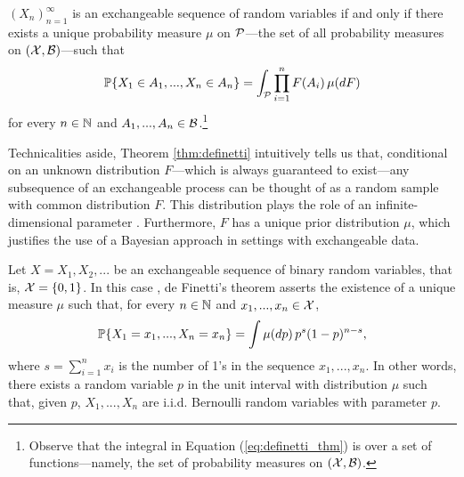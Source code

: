\begin{theorem}[de Finneti] \label{thm:definetti}
	$(X_n)_{n=1}^{\infty}$ is an exchangeable sequence of random variables if and only if there exists a unique probability measure $\mu$ on $\mathcal{P}$---the set of all probability measures on $(\mathcal{X}, \mathcal{B})$---such that
	\begin{equation} \label{eq:definetti_thm}
		\mathbb{P} \{ X_1 \in A_1, ..., X_n \in A_n \} = \int_{\mathcal{P}}  \prod_{i=1}^n F(A_i) \, \mu(dF)
	\end{equation} 
	for every $n \in \mathbb{N}$ and $A_1, ..., A_n \in \mathcal{B}$.\footnote{Observe that the integral in Equation (\ref{eq:definetti_thm}) is over a set of functions---namely, the set of probability measures on $(\mathcal{X}, \mathcal{B})$.}
\end{theorem}




Technicalities aside, Theorem \ref{thm:definetti} intuitively tells us that, conditional on an unknown distribution $F$---which is always guaranteed to exist---any subsequence of an exchangeable process can be thought of as a random sample with common distribution $F$. This distribution plays the role of an infinite-dimensional parameter \cite[][Ch.~4.3]{BernardoSmith:1994:BayesianTheory}. Furthermore, $F$ has a unique prior distribution $\mu$, which justifies the use of a Bayesian approach in settings with exchangeable data.


\begin{mdframed}[backgroundcolor=mygray] 
	\begin{example} \label{ex:binary_definetti}
		Let $X = X_1, X_2, ...$ be an exchangeable sequence of binary random variables, that is, $\mathcal{X} = \{0, 1\}$. In this case \cite[see][p.111]{Diaconis:1988:PartialExchang}, de Finetti's theorem asserts the existence of a unique measure $\mu$ such that, for every $n \in \mathbb{N}$ and $x_1, ..., x_n \in \mathcal{X}$,
		\begin{equation*}
			\mathbb{P} \{ X_1 = x_1, ..., X_n = x_n \} = \int \mu(dp) \, p^s (1-p)^{n-s},
		\end{equation*}
		where $s = \sum_{i=1}^n x_i$ is the number of 1's in the sequence $x_1, ..., x_n$. In other words, there exists a random variable $p$ in the unit interval with distribution $\mu$ such that, given $p$, $X_1, ..., X_n$ are i.i.d. Bernoulli random variables with parameter $p$.
	\end{example}
\end{mdframed}








